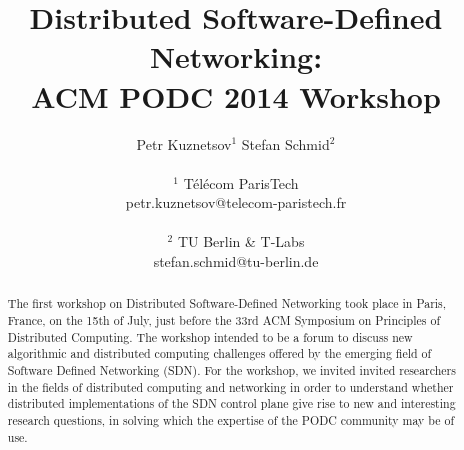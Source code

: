 \documentclass[11pt,pdftex,letter]{article}
\def\SAVESPACE{1}
\begin{document}
\sloppy




\title{Distributed Software-Defined Networking:\\ ACM PODC 2014 Workshop }



\author{
Petr Kuznetsov$^{1}$ \quad Stefan Schmid$^{2}$\\
\\
       $^{1}$ T\'el\'ecom ParisTech\\
        petr.kuznetsov@telecom-paristech.fr\\
\\
        $^{2}$ TU Berlin \& T-Labs \\ %
	    stefan.schmid@tu-berlin.de}


\date{}


\maketitle


\thispagestyle{empty}





\begin{abstract}
The first workshop on Distributed Software-Defined Networking took
place in Paris, France, on the 15th of July, just before 
the 33rd ACM Symposium on Principles of Distributed Computing. 
The workshop intended to be a forum to discuss new algorithmic and
distributed computing challenges offered by the emerging field of
Software Defined Networking (SDN).
For the workshop, we invited invited researchers in the fields of
distributed computing and networking in order to understand whether distributed implementations of the
SDN control plane give rise to new and interesting research questions,
in solving which  the expertise of the PODC community may be of use.
\end{abstract}
\end{document}
